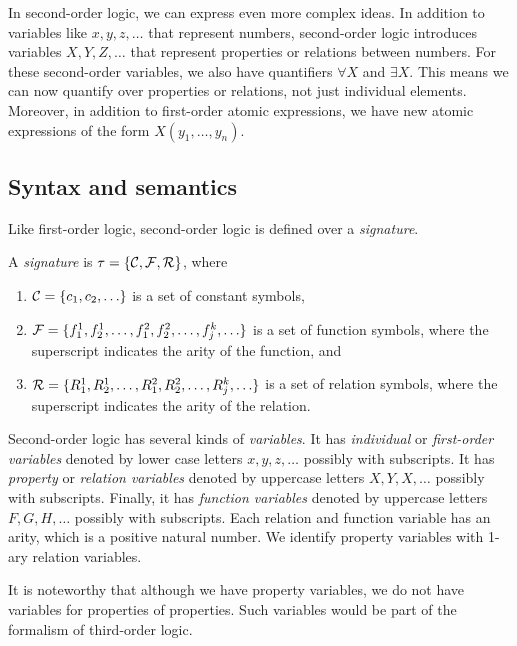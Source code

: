 \documentclass[11pt,twoside=off,numbers=noenddot]{scrbook}
\begin{document}
In second-order logic, we can express even more complex ideas. In addition to variables like $x, y, z, \dots$ that represent numbers, second-order logic introduces variables $X, Y, Z, \dots$ that represent properties or relations between numbers. For these second-order variables, we also have quantifiers $\forall X$ and $\exists X$. This means we can now quantify over properties or relations, not just individual elements. Moreover, in addition to first-order atomic expressions, we have new atomic expressions of the form $X(y_1, \dots, y_n)$.

\subsection{Syntax and semantics}
Like first-order logic, second-order logic is defined over a \emph{signature}.

\begin{definition}
  A \emph{signature} is $\tau = \{ \mathcal{C}, \mathcal{F}, \mathcal{R} \}$, where
  \begin{enumerate}
    \item $\consts = \set{c_1, c_2, \dots}$ is a set of constant symbols,
    \item $\funcs = \set{f_1^1, f_2^1, \dots, f_1^2, f_2^2, \dots, f_j^k, \dots}$ is a set of function symbols, where the superscript indicates the arity of the function, and
    \item $\rels = \set{R_1^1, R_2^1, \dots, R_1^2, R_2^2, \dots, R_j^k, \dots}$ is a set of relation symbols, where the superscript indicates the arity of the relation.
  \end{enumerate}
\end{definition}

Second-order logic has several kinds of \emph{variables}. It has \emph{individual} or \emph{first-order variables} denoted by lower case letters $x, y, z, \dots$ possibly with subscripts. It has \emph{property} or \emph{relation variables} denoted by uppercase letters $X, Y, X, \dots$ possibly with subscripts. Finally, it has \emph{function variables} denoted by uppercase letters $F, G, H, \dots$ possibly with subscripts. Each relation and function variable has an arity, which is a positive natural number. We identify property variables with 1-ary relation variables.

\begin{remark}
  It is noteworthy that although we have property variables, we do not have variables for properties of properties. Such variables would be part of the formalism of third-order logic.
\end{remark}
\end{document}
